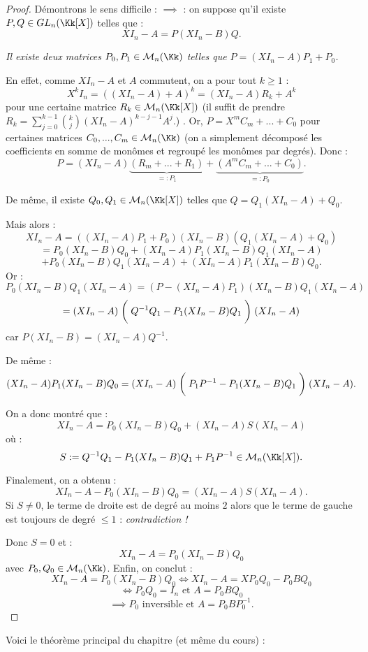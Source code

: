 \documentclass[class=report,crop=false]{standalone}
\newcommand{\GL}{GL}
\begin{document}
\begin{proof}
Démontrons le sens difficile : $\implies $ : on suppose qu'il existe $P,Q\in\GL_n(\Kk[X])$ telles que :
\[XI_n-A = P(XI_n-B)Q.\]

{\it Il existe deux matrices $P_0,P_1 \in \mathcal{M}_n(\Kk)$ telles que $P=(XI_n-A)P_1+P_0$.}

En effet, comme $XI_n-A$ et $A$ commutent, on a pour tout $k \ge 1$ :
\[X^kI_n = ((XI_n-A)+A)^k = (XI_n-A)R_k +A^k\] 
pour une certaine matrice $R_k \in \mathcal{M}_n(\Kk[X])$ (il suffit de prendre $R_k = \sum_{j=0}^{k-1}{k \choose j}(XI_n-A)^{k-j-1}A^j$.)
. Or, $P = X^mC_m + ... + C_0$ pour certaines matrices $C_0,...,C_m \in \mathcal{M}_n(\Kk)$ (on a simplement décomposé les coefficients en somme de monômes et regroupé les monômes par degrés). Donc :
\[P=(XI_n-A) \underbrace{(R_m+...+R_1)}_{=:P_1} + \underbrace{(A^mC_m+...+C_0)}_{=:P_0}.\]

De même, il existe $Q_0,Q_1 \in \mathcal{M}_n(\Kk[X])$ telles que $Q=Q_1(XI_n-A)+Q_0$.

Mais alors :
\[XI_n-A = ((XI_n-A)P_1+P_0)(XI_n-B)(Q_1(XI_n-A)+Q_0) \]
\[ = P_0(XI_n-B)Q_0 + (XI_n-A)P_1(XI_n-B)Q_1(XI_n-A) \]
\[+P_0(XI_n-B)Q_1(XI_n-A)+(XI_n-A)P_1 (XI_n-B)Q_0 .\]
Or :
\[P_0(XI_n-B)Q_1(XI_n-A) = (P-(XI_n-A)P_1)(XI_n-B)Q_1(XI_n-A)\]
\[= (XI_n-A)\biggm( Q^{-1} Q_1 -P_1(XI_n-B)Q_1\biggm)(XI_n-A)\]
car $P(XI_n-B) = (XI_n-A)Q^{-1}$.

De même : \[(XI_n-A)P_1 (XI_n-B)Q_0 = (XI_n-A)\biggm(P_1P^{-1} -P_1(XI_n-B)Q_1\biggm)(XI_n-A) .\]

On a donc montré que :
\[XI_n-A = P_0(XI_n-B)Q_0 +(XI_n-A)S(XI_n-A)\]
où : 
\[S:= Q^{-1} Q_1 -P_1(XI_n-B)Q_1 + P_1P^{-1}  \in \mathcal{M}_n(\Kk[X]).\]

Finalement, on a obtenu :
\[XI_n-A - P_0(XI_n-B)Q_0 = (XI_n-A)S(XI_n-A) .\]
Si $S \neq 0$, le terme de droite est de degré au moins $2$ alors que le  terme de gauche est toujours de degré $\le 1$ : {\it contradiction !} 

Donc $S=0$ et :
\[XI_n-A = P_0(XI_n-B)Q_0\]
avec $P_0,Q_0 \in \mathcal{M}_n(\Kk)$. Enfin, on conclut :
\[XI_n-A = P_0(XI_n-B)Q_0\iff XI_n-A = XP_0Q_0 -P_0BQ_0\]
\[\iff P_0Q_0 = I_n \text{ et } A = P_0BQ_0\]
\[\implies P_0 \mbox{ inversible et }A=P_0BP_0^{-1}.\]

\end{proof}
Voici le théorème principal du chapitre (et même du cours) :
\end{document}
